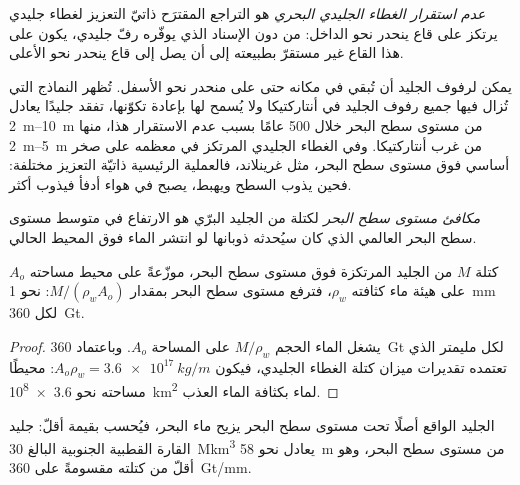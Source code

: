 \begin{definition}\label{def:b3:glaciology:misi}
\emph{عدم استقرار الغطاء الجليدي البحري}
 هو التراجع المقترَح ذاتيّ التعزيز  لغطاء جليدي
يرتكز على قاع ينحدر نحو الداخل: من دون
الإسناد الذي يوفّره رفّ جليدي، يكون  على هذا القاع
غير مستقرّ بطبيعته إلى أن يصل إلى قاع ينحدر نحو الأعلى.
\end{definition}

يمكن لرفوف الجليد أن تُبقي  في مكانه حتى على منحدر نحو الأسفل.
تُظهر النماذج التي تُزال فيها جميع رفوف الجليد في أنتاركتيكا ولا يُسمح لها
بإعادة تكوّنها، تفقد جليدًا يعادل \qtyrange{2}{10}{m} من مستوى سطح البحر خلال 500
عامًا بسبب عدم الاستقرار هذا، منها \qtyrange{2}{5}{m} من غرب
أنتاركتيكا. وفي الغطاء الجليدي المرتكز في معظمه على صخر أساسي فوق مستوى سطح البحر، مثل
غرينلاند، فالعملية الرئيسية ذاتيّة التعزيز مختلفة: فحين يذوب السطح ويهبط،
يصبح في هواء أدفأ فيذوب أكثر.

\begin{definition}\label{def:b3:glaciology:sle}
\emph{مكافئ مستوى سطح البحر} لكتلة من
الجليد البرّي هو الارتفاع في متوسط مستوى سطح البحر العالمي الذي كان سيُحدثه ذوبانها
لو انتشر الماء فوق المحيط الحالي.
\end{definition}

\begin{proposition}\label{prop:b3:glaciology:sle}
كتلة $M$ من الجليد المرتكزة فوق مستوى سطح البحر، موزّعةً على محيط مساحته
$A_o$ على هيئة ماء كثافته $\rho_w$، فترفع مستوى سطح البحر بمقدار $M/(\rho_wA_o)$:
نحو \qty{1}{mm} لكل \qty{360}{Gt}.
\end{proposition}

\begin{proof}
يشغل الماء الحجم $M/\rho_w$ على المساحة $A_o$. وباعتماد
\qty{360}{Gt} لكل مليمتر الذي تعتمده تقديرات ميزان كتلة الغطاء الجليدي،
فيكون $A_o\rho_w = \qty{3.6e17}{kg/m}$: محيطًا مساحته نحو
\qty{3.6e8}{km^2} لماء بكثافة الماء العذب.
\end{proof}

الجليد الواقع أصلًا تحت مستوى سطح البحر يزيح ماء البحر، فيُحسب بقيمة أقلّ:
جليد القارة القطبية الجنوبية البالغ \qty{30}{\mega km^3} يعادل نحو
\qty{58}{m} من مستوى سطح البحر، وهو أقلّ من كتلته مقسومةً على
\qty{360}{Gt/mm}.


